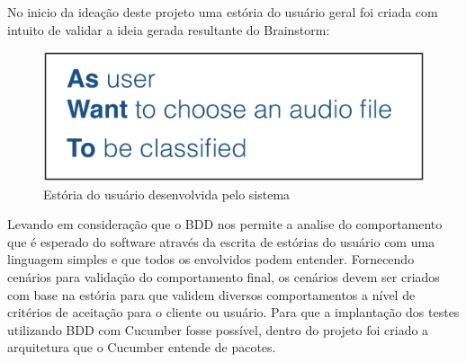 No inicio da ideação deste projeto uma estória do usuário geral foi criada com intuito de validar a ideia gerada resultante do Brainstorm: 


\begin{figure}[H]
	\centering
	\captionsetup{justification=centering,margin=2cm}
	\includegraphics[scale=0.65]{capitulos/validacao/figuras/estoriaDoUsuarioDaAplicacao.eps}
	\caption{Estória do usuário desenvolvida pelo sistema}
	\label{fig:result-engajamento}
\end{figure}

Levando em consideração que o BDD nos permite a analise do comportamento que é esperado do software através da escrita de estórias do usuário com uma linguagem simples e que todos os envolvidos podem entender. Fornecendo cenários para validação do comportamento final, os cenários devem ser criados com base na estória para que validem diversos comportamentos a nível de critérios de aceitação para o cliente ou usuário. Para que a implantação dos testes utilizando BDD com Cucumber fosse possível, dentro do projeto foi criado a arquitetura que o Cucumber entende de pacotes.

